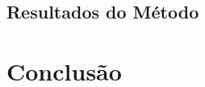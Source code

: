 \documentclass[
	12pt,				%
	openright,			%
	oneside,			%
	a4paper,			%
	english,			%
	french,				%
	spanish,			%
	brazil,				%
	]{abntex2}
\begin{document}


\section{Resultados do Método}
\label{sec: resultados}



 \chapter{Conclusão}
 \label{ch: conclusao}
 



% 

\postextual




%
%

\end{document}
